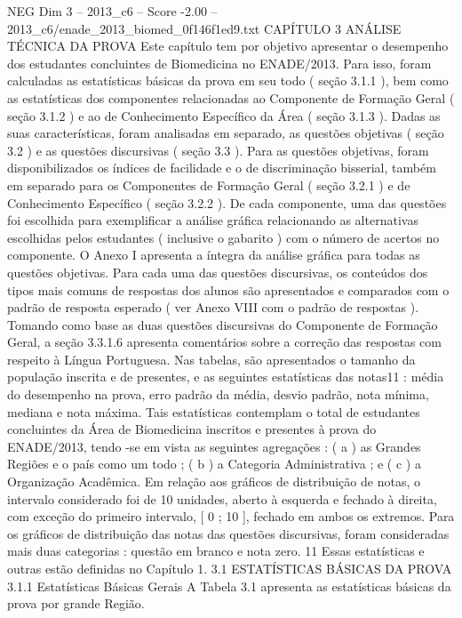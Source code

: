 \begin{textsample}{NEG Dim 3 – 2013\_c6 – Score -2.00 – 2013\_c6/enade\_2013\_biomed\_0f146f1ed9.txt}  \label{ex:f3_neg_054}
CAPÍTULO 3 ANÁLISE TÉCNICA DA PROVA Este capítulo tem por objetivo apresentar o desempenho dos estudantes concluintes de Biomedicina no ENADE/2013.
Para isso, foram calculadas as estatísticas básicas da prova em seu todo ( seção 3.1.1 ), bem como as estatísticas dos componentes relacionadas ao Componente de Formação Geral ( seção 3.1.2 ) e ao de Conhecimento Específico da Área ( seção 3.1.3 ).
Dadas as suas características, foram analisadas em separado, as questões objetivas ( seção 3.2 ) e as questões discursivas ( seção 3.3 ).
Para as questões objetivas, foram disponibilizados os índices de facilidade e o de discriminação bisserial, também em separado para os Componentes de Formação Geral ( seção 3.2.1 ) e de Conhecimento Específico ( seção 3.2.2 ).
De cada componente, uma das questões foi escolhida para exemplificar a análise gráfica relacionando as alternativas escolhidas pelos estudantes ( inclusive o gabarito ) com o número de acertos no componente.
O Anexo I apresenta a íntegra da análise gráfica para todas as questões objetivas.
Para cada uma das questões discursivas, os conteúdos dos tipos mais comuns de respostas dos alunos são apresentados e comparados com o padrão de resposta esperado ( ver Anexo VIII com o padrão de respostas ).
Tomando como base as duas questões discursivas do Componente de Formação Geral, a seção 3.3.1.6 apresenta comentários sobre a correção das respostas com respeito à Língua Portuguesa.
Nas tabelas, são apresentados o tamanho da população inscrita e de presentes, e as seguintes estatísticas das notas11 : média do desempenho na prova, erro padrão da média, desvio padrão, nota mínima, mediana e nota máxima.
Tais estatísticas contemplam o total de estudantes concluintes da Área de Biomedicina inscritos e presentes à prova do ENADE/2013, tendo -se em vista as seguintes agregações : ( a ) as Grandes Regiões e o país como um todo ; ( b ) a Categoria Administrativa ; e ( c ) a Organização Acadêmica.
Em relação aos gráficos de distribuição de notas, o intervalo considerado foi de 10 unidades, aberto à esquerda e fechado à direita, com exceção do primeiro intervalo, [ 0 ; 10 ], fechado em ambos os extremos.
Para os gráficos de distribuição das notas das questões discursivas, foram consideradas mais duas categorias : questão em branco e nota zero. 11 Essas estatísticas e outras estão definidas no Capítulo 1. 3.1 ESTATÍSTICAS BÁSICAS DA PROVA 3.1.1 Estatísticas Básicas Gerais A Tabela 3.1 apresenta as estatísticas básicas da prova por grande Região.

\end{textsample}
